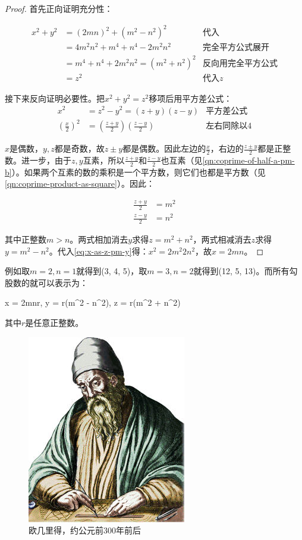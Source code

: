 \documentclass[b5paper]{ctexart}
\begin{document}
\begin{proof}
首先正向证明充分性：

\begin{align*}
x^2 + y^2 &= (2mn)^2 + (m^2 - n^2)^2 & \text{代入} \\
  &= 4m^2n^2 + m^4 + n^4 - 2m^2n^2 & \text{完全平方公式展开} \\
  &= m^4 + n^4 + 2m^2n^2 = (m^2 + n^2)^2 &\text{反向用完全平方公式} \\
  &= z^2 &\text{代入}z
\end{align*}

接下来反向证明必要性。把$x^2 + y^2 = z^2$移项后用平方差公式：
\begin{align}
x^2 &= z^2 - y^2 = (z + y)(z - y) &\text{平方差公式} \label{eq:x-as-z-pm-y} \\
(\frac{x}{2})^2 &= (\frac{z + y}{2}) (\frac{z - y}{2}) &\text{左右同除以4}
\end{align}

$x$是偶数，$y, z$都是奇数，故$z \pm y$都是偶数。因此左边的$\frac{x}{2}$，右边的$\frac{z \pm y}{2}$都是正整数。进一步，由于$z, y$互素，所以$\frac{z + y}{2}$和$\frac{z - y}{2}$也互素（见\cref{qn:coprime-of-half-a-pm-b}）。如果两个互素的数的乘积是一个平方数，则它们也都是平方数（见\cref{qn:coprime-product-as-square}）。因此：

\begin{align*}
\frac{z+y}{2} &= m^2 \\
\frac{z-y}{2} &= n^2
\end{align*}

其中正整数$m > n$。两式相加消去$y$求得$z = m^2 + n^2$，两式相减消去$z$求得$y = m^2 - n^2$。代入\cref{eq:x-as-z-pm-y}得：$x^2 = 2m^2 2n^2$，故$x = 2mn$。
\end{proof}

例如取$m = 2, n = 1$就得到(3, 4, 5)，取$m = 3, n = 2$就得到(12, 5, 13)。而所有勾股数的就可以表示为：

\be
x = 2mnr, \quad y = r(m^2 - n^2), \quad z = r(m^2 + n^2)
\ee

其中$r$是任意正整数。

\begin{figure}[htbp]
 \centering
 \includegraphics[scale=0.6]{img/Euclid}
 \caption{欧几里得，约公元前300年前后}
 \label{fig:Euclid}
\end{figure}
\end{document}
